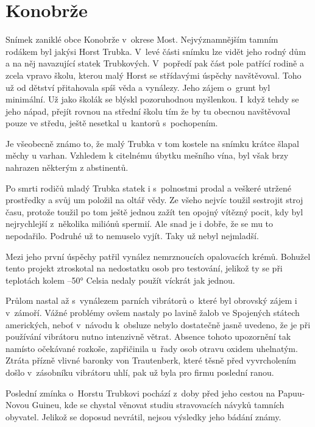 
\chapter{Konobrže}

Snímek zaniklé obce Konobrže v~okrese Most. Nejvýznamnějším tamním rodákem byl
jakýsi Horst Trubka. V~levé části snímku lze vidět jeho rodný dům a na něj
navazující statek Trubkových. V~popředí pak část pole patřící rodině a zcela
vpravo školu, kterou malý Horst se střídavými úspěchy navštěvoval. Toho už od
dětství přitahovala spíš věda a vynálezy. Jeho zájem o~grunt byl minimální. Už
jako školák se blýskl pozoruhodnou myšlenkou. I~když tehdy se jeho nápad,
přejít rovnou na střední školu tím že by tu obecnou navštěvoval pouze ve
středu, ještě nesetkal u~kantorů s~pochopením.

Je všeobecně známo to, že malý Trubka v tom kostele na snímku krátce šlapal
měchy u varhan. Vzhledem k citelnému úbytku mešního vína, byl však brzy
nahrazen některým z abstinentů.

Po smrti rodičů mladý Trubka statek i s~polnostmi prodal a veškeré utržené
prostředky a svůj um položil na oltář vědy. Ze všeho nejvíc toužil sestrojit
stroj času, protože toužil po tom ještě jednou zažít ten opojný vítězný pocit,
kdy byl nejrychlejší z~několika miliónů spermií. Ale snad je i dobře, že se mu
to nepodařilo. Podruhé už to nemuselo vyjít. Taky už nebyl nejmladší.

Mezi jeho první úspěchy patřil vynález nemrznoucích opalovacích krémů. Bohužel
tento projekt ztroskotal na nedostatku osob pro testování, jelikož ty se při
teplotách kolem --50° Celsia nedaly použít víckrát jak jednou.

Průlom nastal až s~vynálezem parních vibrátorů o~které byl obrovský zájem i
v~zámoří. Vážné problémy ovšem nastaly po lavině žalob ve Spojených státech
amerických, neboť v~návodu k~obsluze nebylo dostatečně jasně uvedeno, že je při
používání vibrátoru nutno intenzivně větrat. Absence tohoto upozornění tak
namísto očekávané rozkoše, zapřičinila u~řady osob otravu oxidem uhelnatým.
Ztráta přízně vlivné baronky von Trautenberk, které těsně před vyvrcholením
došlo v~zásobníku vibrátoru uhlí, pak už byla pro firmu poslední ranou.

Poslední zmínka o~Horstu Trubkovi pochází z~doby před jeho cestou na
Papuu-Novou Guineu, kde se chystal věnovat studiu stravovacích návyků tamních
obyvatel. Jelikož se doposud nevrátil, nejsou výsledky jeho bádání známy.

